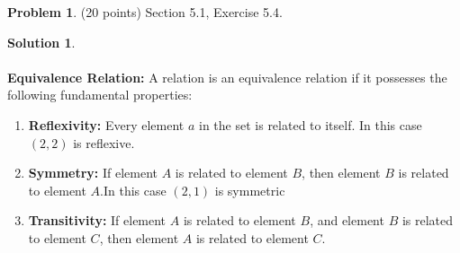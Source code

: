 \documentclass{article}
\theoremstyle{definition}
\newtheorem{problem}{Problem}
\newtheorem*{solution}{Solution}
\begin{document}
\newpage
\begin{problem} (20 points) Section 5.1, Exercise 5.4.
\end{problem}
\begin{solution} 
  ~\\
  ~\\
  \textbf{Equivalence Relation:} A relation is an equivalence relation if it possesses the following fundamental properties:

\begin{enumerate}
    \item \textbf{Reflexivity:} Every element $a$ in the set is related to itself. In this case $(2, 2)$ is reflexive. 
    
    \item \textbf{Symmetry:} If element $A$ is related to element $B$, then element $B$ is related to element $A$.In this case $(2, 1)$ is symmetric
    
    \item \textbf{Transitivity:} If element $A$ is related to element $B$, and element $B$ is related to element $C$, then element $A$ is related to element $C$.
\end{enumerate}
\end{solution}
\end{document}
